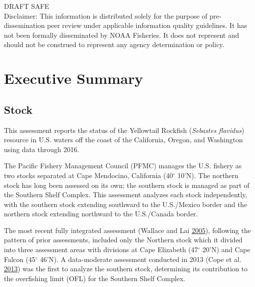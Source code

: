 \documentclass[12pt,]{article}
\begin{document}
\begin{center}
\vfill
DRAFT SAFE\\
Disclaimer: This information is distributed solely for the purpose of pre-dissemination
peer review under applicable information quality guidelines. It has not been formally
disseminated by NOAA Fisheries. It does not represent and should not be construed to
represent any agency determination or policy. 

\vspace{.3cm}

\maketitle

\setcounter{page}{1}
\end{center}

{
\setcounter{tocdepth}{4}
\tableofcontents
}
\setlength{\parskip}{5mm plus1mm minus1mm} \pagebreak

 \setcounter{page}{1}
\renewcommand{\thefigure}{\alph{figure}}
\renewcommand{\thetable}{\alph{table}}

\section*{Executive Summary}\label{executive-summary}

\subsection*{Stock}\label{stock}

This assessment reports the status of the Yellowtail Rockfish
(\emph{Sebastes flavidus}) resource in U.S. waters off the coast of the
California, Oregon, and Washington using data through 2016.

The Pacific Fishery Management Council (PFMC) manages the U.S. fishery
as two stocks separated at Cape Mendocino, California (40\(^\circ\)
10'N). The northern stock has long been assessed on its own; the
southern stock is managed as part of the Southern Shelf Complex. This
assessment analyzes each stock independently, with the southern stock
extending southward to the U.S./Mexico border and the northern stock
extending northward to the U.S./Canada border.

The most recent fully integrated assessment (Wallace and Lai
\protect\hyperlink{ref-Wallace2005}{2005}), following the pattern of
prior assessments, included only the Northern stock which it divided
into three assessment areas with divisions at Cape Elizabeth
(47\(^\circ\) 20'N) and Cape Falcon (45\(^\circ\) 46'N). A data-moderate
assessment conducted in 2013 (Cope et al.
\protect\hyperlink{ref-Cope2013}{2013}) was the first to analyze the
southern stock, determining its contribution to the overfishing limit
(OFL) for the Southern Shelf Complex.
\end{document}
